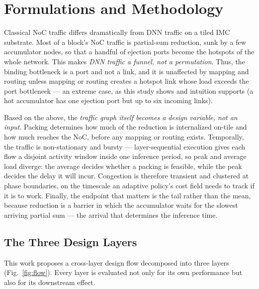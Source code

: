 \section{Formulations and Methodology}
\label{sec:method}
Classical NoC traffic differs dramatically from DNN traffic on a tiled IMC
substrate. Most of a block's NoC traffic is partial-sum reduction, sunk by a few
accumulator nodes, so that a handful of ejection ports become the hotspots of
the whole network. This makes \emph{DNN traffic a funnel, not a permutation}.
Thus, the binding bottleneck is a port and not a link, and it is unaffected by
mapping and routing unless mapping or routing creates a hotspot link whose load
exceeds the port bottleneck --- an extreme case, as this study shows and
intuition supports (a hot accumulator has one ejection port but up to six
incoming links).

Based on the above, the \emph{traffic graph itself becomes a design variable,
not an input}. Packing determines how much of the reduction is internalized on-tile and how much reaches the NoC, before any mapping or routing exists. Temporally, the traffic is non-stationary and bursty ---
layer-sequential execution gives each flow a disjoint activity window inside one
inference period, so peak and average load diverge: the average decides whether a packing is feasible, while the peak decides the delay it will incur. Congestion is therefore transient and clustered at phase boundaries, on the timescale an adaptive policy's cost field needs to track if it is to work.
Finally, the endpoint that matters is the tail rather than the mean, because
reduction is a barrier in which the accumulator waits for the slowest arriving
partial sum --- the arrival that determines the inference time. 

\subsection{The Three Design Layers}
\label{sec:layers}
This work proposes a cross-layer design flow decomposed into three layers (Fig.~\ref{fig:flow}). Every layer is evaluated not only for its own performance but also for its downstream effect.

